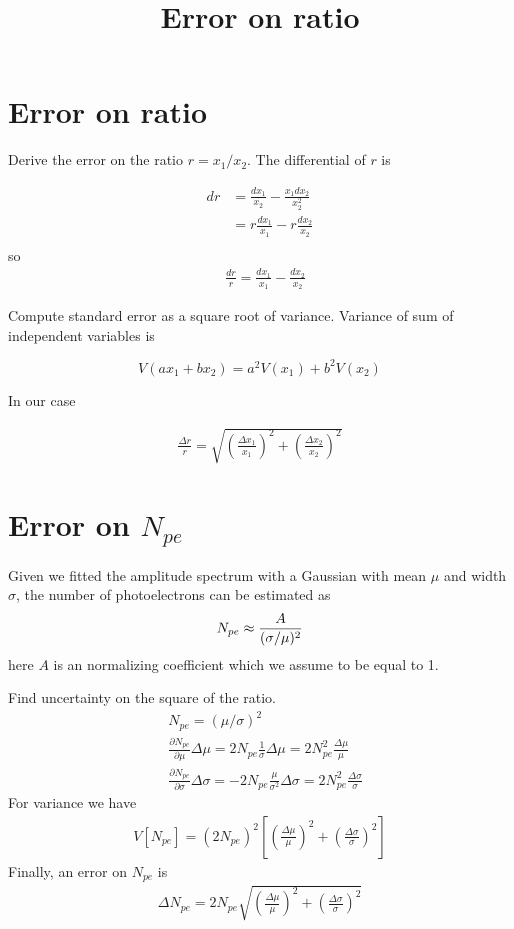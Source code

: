 \documentclass[english]{article}
\begin{document}
\title{Error on ratio}

\maketitle

\section{Error on ratio}

Derive the error on the ratio $r = x_1/x_2$.
The differential of $r$ is

\begin{align*}
dr &= \frac{dx_1}{x_2} - \frac{x_1dx_2}{x_2^2} \\
   &= r\frac{dx_1}{x_1} - r\frac{dx_2}{x_2} \\
\end{align*}
%
so
%
\begin{align*}
& \frac{dr}{r} = \frac{dx_1}{x_1} - \frac{dx_2}{x_2}
\end{align*}

Compute standard error as a square root of variance. Variance of sum of independent variables is 

$$
V(ax_1+bx_2) = a^2V(x_1) + b^2V(x_2)
$$

In our case

\begin{align*}
\frac{\Delta r}{r} = \sqrt{\left( \frac{\Delta x_1}{x_1} \right)^2 + \left( \frac{\Delta x_2}{x_2} \right)^2}
\end{align*}

\section{Error on $N_{pe}$}

Given we fitted the amplitude spectrum with a Gaussian with mean $\mu$ and width $\sigma$, the number of photoelectrons can be estimated as 
$$
N_{pe} \approx \frac{A}{(\sigma/\mu)^2} \\
$$
here $A$ is an normalizing coefficient which we assume to be equal to 1.

Find uncertainty on the square of the ratio.
%
\begin{align*}
& N_{pe} = (\mu/\sigma)^2 \\
& \frac{\partial N_{pe}}{\partial \mu} \Delta\mu = 2N_{pe} \frac{1}{\sigma} \Delta\mu 
= 2N_{pe}^2 \frac{\Delta\mu}{\mu}  \\
& \frac{\partial N_{pe}}{\partial \sigma} \Delta\sigma = -2N_{pe} \frac{\mu}{\sigma^2} \Delta\sigma
=  2N_{pe}^2 \frac{\Delta\sigma}{\sigma}
\end{align*}
%
For variance we have
%
\begin{align*}
V[N_{pe}] = \left( 2N_{pe}\right)^2
\left[
\left( \frac{\Delta\mu}{\mu} \right)^2 + \left( \frac{\Delta\sigma}{\sigma} \right)^2
\right]
\end{align*}
%
Finally, an error on $N_{pe}$ is
%
\begin{align*}
\Delta N_{pe} = 2N_{pe}\sqrt{\left( \frac{\Delta\mu}{\mu} \right)^2 + \left( \frac{\Delta\sigma}{\sigma} \right)^2}
\end{align*}
\end{document}

